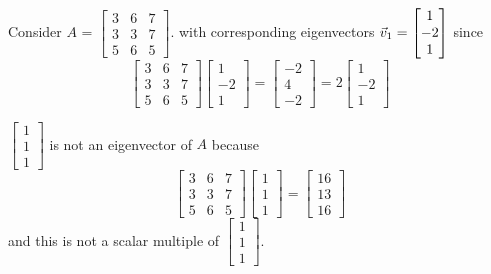 \documentclass[english, 12pt]{article}
\begin{document}
\begin{exmp}
Consider $A$ = $\begin{bmatrix} 3 & 6 & 7 \\ 3 & 3 & 7 \\ 5 & 6 & 5 \end{bmatrix}$. with corresponding eigenvectors $\vec{v}_{1} = \begin{bmatrix} 1 \\ -2 \\ 1 \end{bmatrix}$ since
\[\begin{bmatrix} 3 & 6 & 7 \\ 3 & 3 & 7 \\ 5 & 6 & 5 \end{bmatrix} \begin{bmatrix} 1 \\ -2 \\ 1 \end{bmatrix} = \begin{bmatrix} -2 \\ 4 \\ -2 \end{bmatrix} = 2 \begin{bmatrix} 1 \\ -2 \\ 1 \end{bmatrix}\]
\end{exmp}

\begin{exmp}
$\begin{bmatrix} 1 \\ 1 \\ 1 \end{bmatrix}$ is not an eigenvector of $A$ because
\[\begin{bmatrix} 3 & 6 & 7 \\ 3 & 3 & 7 \\ 5 & 6 & 5 \end{bmatrix} \begin{bmatrix} 1 \\ 1 \\ 1 \end{bmatrix} = \begin{bmatrix} 16 \\ 13 \\ 16 \end{bmatrix}\]
and this is not a scalar multiple of $\begin{bmatrix} 1 \\ 1 \\ 1 \end{bmatrix}$.
\end{exmp}
\end{document}
